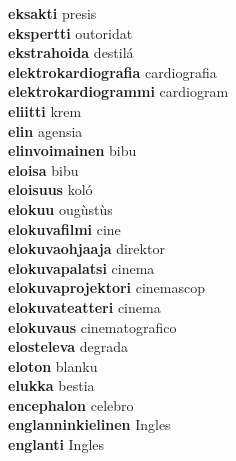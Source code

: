 \textbf{eksakti } presis \\
\textbf{ekspertti } outoridat \\
\textbf{ekstrahoida } destilá \\
\textbf{elektrokardiografia } cardiografia \\
\textbf{elektrokardiogrammi } cardiogram \\
\textbf{eliitti } krem \\
\textbf{elin } agensia \\
\textbf{elinvoimainen } bibu \\
\textbf{eloisa } bibu \\
\textbf{eloisuus } koló \\
\textbf{elokuu } ougùstùs \\
\textbf{elokuvafilmi } cine \\
\textbf{elokuvaohjaaja } direktor \\
\textbf{elokuvapalatsi } cinema \\
\textbf{elokuvaprojektori } cinemascop \\
\textbf{elokuvateatteri } cinema \\
\textbf{elokuvaus } cinematografico \\
\textbf{elosteleva } degrada \\
\textbf{eloton } blanku \\
\textbf{elukka } bestia \\
\textbf{encephalon } celebro \\
\textbf{englanninkielinen } Ingles \\
\textbf{englanti } Ingles \\
